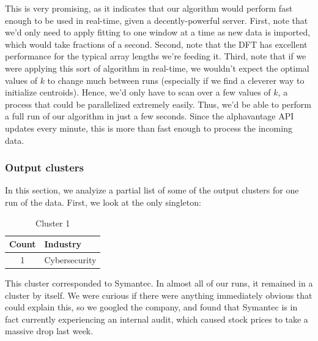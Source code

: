 \documentclass[final]{article}
\begin{document}
This is very promising, as it indicates that our algorithm would
perform fast enough to be used in real-time, given a decently-powerful
server. First, note that we'd only need to apply fitting to one window
at a time as new data is imported, which would take fractions of a
second. Second, note that the DFT has excellent performance for the
typical array lengths we're feeding it. Third, note that if we were
applying this sort of algorithm in real-time, we wouldn't expect the
optimal values of $k$ to change much between runs (especially if we
find a cleverer way to initialize centroids). Hence, we'd only have to
scan over a few values of $k$, a process that could be parallelized
extremely easily. Thus, we'd be able to perform a full run of our
algorithm in just a few seconds. Since the alphavantage API updates
every minute, this is more than fast enough to process the incoming
data.

\subsubsection{Output clusters}

In this section, we analyize a partial list of some of the output
clusters for one run of the data. First, we look at the only
singleton:

\begin{table}[H]
\centering
\caption{Cluster 1}
\label{c1}
\begin{tabular}{@{}cl@{}}
\toprule
Count & Industry  \\ \midrule
1 & Cybersecurity \\
\bottomrule
\end{tabular}
\end{table}

This cluster corresponded to Symantec. In almost all of our runs, it
remained in a cluster by itself. We were curious if there were
anything immediately obvious that could explain this, so we googled
the company, and found that Symantec is in fact currently experiencing
an internal audit, which caused stock prices to take a massive drop
last week.
\end{document}
